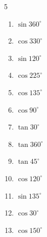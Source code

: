 \begin{multicols}{5}
\begin{enumerate}
  \item $\displaystyle \sin{360^\circ}$

        \phantom{$\displaystyle =0$}

  \item $\displaystyle \cos{330^\circ}$


  \item $\displaystyle \sin{120^\circ}$


  \item $\displaystyle \cos{225^\circ}$


  \item $\displaystyle \cos{135^\circ}$


  \item $\displaystyle \cos{90^\circ}$

        \phantom{$\displaystyle =0$}

  \item $\displaystyle \tan{30^\circ}$


  \item $\displaystyle \tan{360^\circ}$

        \phantom{$\displaystyle =0$}

  \item $\displaystyle \tan{45^\circ}$

        \phantom{$\displaystyle =1$}

  \item $\displaystyle \cos{120^\circ}$


  \item $\displaystyle \sin{135^\circ}$


  \item $\displaystyle \cos{30^\circ}$


\columnbreak %

  \item $\displaystyle \cos{150^\circ}$


\end{enumerate}
\end{multicols}

